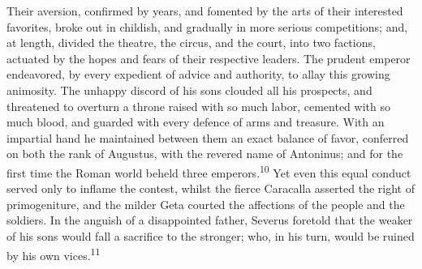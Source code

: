 Their aversion, confirmed by years, and fomented by the arts of
their interested favorites, broke out in childish, and gradually
in more serious competitions; and, at length, divided the
theatre, the circus, and the court, into two factions, actuated
by the hopes and fears of their respective leaders. The prudent
emperor endeavored, by every expedient of advice and authority,
to allay this growing animosity. The unhappy discord of his sons
clouded all his prospects, and threatened to overturn a throne
raised with so much labor, cemented with so much blood, and
guarded with every defence of arms and treasure. With an
impartial hand he maintained between them an exact balance of
favor, conferred on both the rank of Augustus, with the revered
name of Antoninus; and for the first time the Roman world beheld
three emperors.\textsuperscript{10} Yet even this equal conduct served only to
inflame the contest, whilst the fierce Caracalla asserted the
right of primogeniture, and the milder Geta courted the
affections of the people and the soldiers. In the anguish of a
disappointed father, Severus foretold that the weaker of his sons
would fall a sacrifice to the stronger; who, in his turn, would
be ruined by his own vices.\textsuperscript{11}



